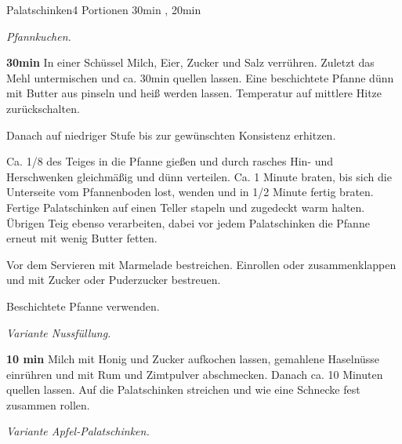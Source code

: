 \documentclass[../recipe-collections/cooking.tex]{subfiles}
\begin{document}
\begin{recipe}{Palatschinken}{4 Portionen }{30min , 20min }

  \freeform{}\textit{Pfannkuchen.}


  \textbf{30min}
  In einer Schüssel Milch, Eier, Zucker und Salz verrühren.
  Zuletzt das Mehl untermischen und ca. 30min quellen lassen.
  Eine beschichtete Pfanne dünn mit Butter aus pinseln und heiß werden lassen.
  Temperatur auf mittlere Hitze zurückschalten.

  \newstep{}Danach auf niedriger Stufe bis zur gewünschten Konsistenz erhitzen.

  \newstep{}Ca. 1/8 des Teiges in die Pfanne gießen und durch rasches Hin- und Herschwenken gleichmäßig und dünn verteilen.
  Ca. 1 Minute braten, bis sich die Unterseite vom Pfannenboden lost, wenden und in 1/2 Minute fertig braten.
  Fertige Palatschinken auf einen Teller stapeln und zugedeckt warm halten.
  Übrigen Teig ebenso verarbeiten, dabei vor jedem Palatschinken die Pfanne erneut mit wenig Butter fetten.

  \newstep{}Vor dem Servieren mit Marmelade bestreichen.
  Einrollen oder zusammenklappen und mit Zucker oder Puderzucker bestreuen.

  \freeform{}\hrulefill{}

  \freeform{}
  Beschichtete Pfanne verwenden.

  \newpage{}

  \freeform{}\hrulefill{}

  \freeform{}\textit{Variante Nussfüllung.}


  \textbf{10 min}
  Milch mit Honig und Zucker aufkochen lassen, gemahlene Haselnüsse einrühren und mit Rum und Zimtpulver abschmecken.
  Danach ca. 10 Minuten quellen lassen.
  Auf die Palatschinken streichen und wie eine Schnecke fest zusammen rollen.

  \freeform{}\hrulefill{}

  \freeform{}\textit{Variante Apfel-Palatschinken.}



\end{recipe}
\end{document}
